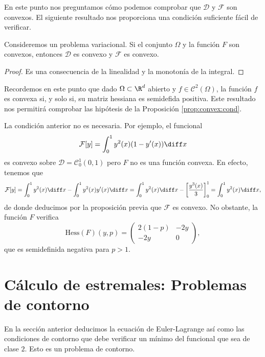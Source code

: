 \documentclass{article}
\begin{document}
En este punto nos preguntamos cómo podemos comprobar que $\mathcal{D}$ y $\mathcal{F}$ son
convexos. El siguiente resultado nos proporciona una condición suficiente fácil de verificar.

\begin{prop} \label{prop:convex:cond} Consideremos un problema
  variacional. Si el conjunto $\Omega$ y la función $F$ son convexos, entonces $\mathcal{D}$ es
  convexo y $\mathcal{F}$ es convexo.
\end{prop}
\begin{proof}
  Es una consecuencia de la linealidad y la monotonía de la integral.
\end{proof}

\begin{remark}
  Recordemos en este punto que dado $\Omega \subset \R^d$ abierto y $f \in \mathcal{C}^2(\Omega)$,
  la función $f$ es convexa si, y solo si, su matriz hessiana es semidefida positiva. Este resultado
  nos permitirá comprobar las hipótesis de la Proposición \ref{prop:convex:cond}.
\end{remark}

\begin{remark}
  La condición anterior no es necesaria. Por ejemplo, el funcional
  \[ \mathcal{F}[y] = \int_0^1 y^2(x)(1 - y'(x)) \diff x \] es convexo sobre
  $\mathcal{D} = \mathcal{C}_0^1(0,1)$ pero $F$ no es una función convexa.  En efecto, tenemos que
  \[ \mathcal{F}[y] = \int_0^1 y^2(x) \diff x - \int_0^1 y^2(x)y'(x) \diff x = \int_0^1 y^2(x) \diff
    x - \left[ \frac{y^3(x)}{3}\right]^1_0 = \int_0^1 y^2(x) \diff x, \] de donde deducimos por la
  proposición previa que $\mathcal{F}$ es convexo. No obstante, la función $F$ verifica
  \[ \mathrm{Hess}(F)(y,p) = \left(
      \begin{matrix}
        2(1-p) & -2y \\
        -2y & 0
      \end{matrix}
    \right), \] que es semidefinida negativa para $p > 1$.
\end{remark}

\section{Cálculo de estremales: Problemas de contorno}

En la sección anterior deducimos la ecuación de Euler-Lagrange así como las condiciones de contorno
que debe verificar un mínimo del funcional que sea de clase $2$. Esto es un problema de contorno.
\end{document}
